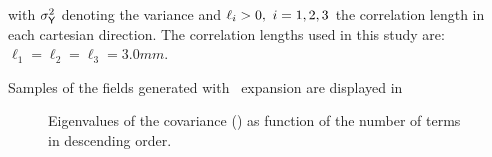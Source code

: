 \noindent with ${\sigma_{\mathsf{Y}}^{2}}$ denoting the variance and $\ell_{i}>0,\ i=1,2,3$ the correlation length in each cartesian direction.
The correlation lengths used  in this study are: $\ell_{1}=\ell_{2}=\ell_{3}=3.0mm$.

Samples of the fields generated with \kl\ expansion are displayed in 

\begin{figure}[H]
 \centering
 \caption{Eigenvalues of the covariance () as function of the number of terms in descending order.}
 \label{eigenval}
\end{figure}

